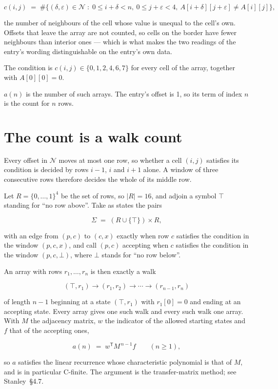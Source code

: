 \documentclass[11pt]{article}
\theoremstyle{definition}
\begin{document}
\[c(i,j) \;=\; \#\bigl\{(\delta,\varepsilon)\in\mathcal{N} \;:\; 0\le i+\delta<n,\ 0\le j+\varepsilon<4,\ A[i+\delta][j+\varepsilon] \neq A[i][j]\bigr\},\]

the number of neighbours of the cell whose value is unequal to the cell's own. Offsets that leave the array are not counted, so cells on the border have fewer neighbours than interior ones --- which is what makes the two readings of the entry's wording distinguishable on the entry's own data.

The condition is $c(i,j) \in \{0, 1, 2, 4, 6, 7\}$ for every cell of the array, together with $A[0][0]=0$.

$a(n)$ is the number of such arrays. The entry's offset is 1, so its term of index $n$ is the count for $n$ rows.

\section{The count is a walk count}

Every offset in $\mathcal{N}$ moves at most one row, so whether a cell $(i,j)$ satisfies its condition is decided by rows $i-1$, $i$ and $i+1$ alone. A window of three consecutive rows therefore decides the whole of its middle row.

Let $R = \{0,\dots,1\}^{4}$ be the set of rows, so $|R| = 16$, and adjoin a symbol $\top$ standing for ``no row above''. Take as states the pairs

\[\Sigma \;=\; (R \cup \{\top\}) \times R,\]

with an edge from $(p,c)$ to $(c,x)$ exactly when row $c$ satisfies the condition in the window $(p,c,x)$, and call $(p,c)$ accepting when $c$ satisfies the condition in the window $(p,c,\bot)$, where $\bot$ stands for ``no row below''.

An array with rows $r_1,\dots,r_n$ is then exactly a walk

\[(\top,r_1) \to (r_1,r_2) \to \cdots \to (r_{n-1},r_n)\]

of length $n-1$ beginning at a state $(\top,r_1)$ with $r_1[0]=0$ and ending at an accepting state. Every array gives one such walk and every such walk one array. With $M$ the adjacency matrix, $w$ the indicator of the allowed starting states and $f$ that of the accepting ones,

\[a(n) \;=\; w^{\mathsf T} M^{\,n-1} f \qquad (n \ge 1),\]

so $a$ satisfies the linear recurrence whose characteristic polynomial is that of $M$, and is in particular C-finite. The argument is the transfer-matrix method; see Stanley~\S4.7.
\end{document}
